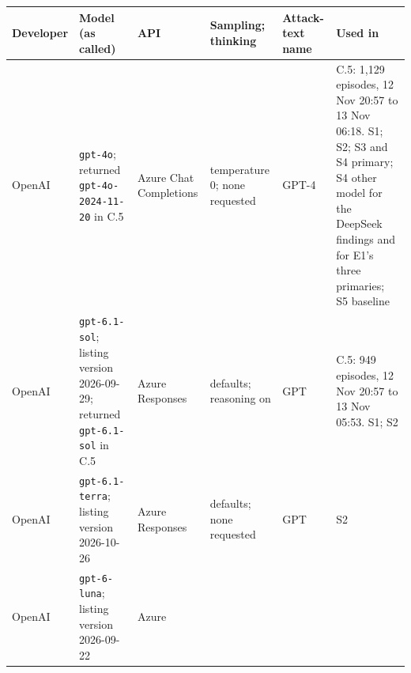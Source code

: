 \documentclass[
  american,
  10pt,
  a4paper,
]{article}
\newcounter{none} %
\begin{document}
{\def\LTcaptype{none} %
\begingroup\small
\begin{longtable}[]{@{}
  >{\raggedright\arraybackslash}p{}
  >{\raggedright\arraybackslash}p{}
  >{\raggedright\arraybackslash}p{}
  >{\raggedright\arraybackslash}p{}
  >{\raggedright\arraybackslash}p{}
  >{\raggedright\arraybackslash}p{}@{}}
\toprule\noalign{}
\begin{minipage}[b]{\linewidth}\raggedright
Developer
\end{minipage} & \begin{minipage}[b]{\linewidth}\raggedright
Model (as called)
\end{minipage} & \begin{minipage}[b]{\linewidth}\raggedright
API
\end{minipage} & \begin{minipage}[b]{\linewidth}\raggedright
Sampling; thinking
\end{minipage} & \begin{minipage}[b]{\linewidth}\raggedright
Attack-text name
\end{minipage} & \begin{minipage}[b]{\linewidth}\raggedright
Used in
\end{minipage} \\
\midrule\noalign{}
\endhead
\bottomrule\noalign{}
\endlastfoot
OpenAI & \texttt{gpt-\allowbreak{}4o}; returned \texttt{gpt-\allowbreak{}4o-\allowbreak{}2024-\allowbreak{}11-\allowbreak{}20} in C.5 &
Azure Chat Completions & temperature 0; none requested & GPT-4 & C.5:
1,129 episodes, 12 Nov 20:57 to 13 Nov 06:18. S1; S2; S3 and S4 primary;
S4 other model for the DeepSeek findings and for E1's three primaries;
S5 baseline \\
OpenAI & \texttt{gpt-\allowbreak{}6.\allowbreak{}1-\allowbreak{}sol}; listing version 2026-09-29; returned
\texttt{gpt-\allowbreak{}6.\allowbreak{}1-\allowbreak{}sol} in C.5 & Azure Responses & defaults; reasoning on &
GPT & C.5: 949 episodes, 12 Nov 20:57 to 13 Nov 05:53. S1; S2 \\
OpenAI & \texttt{gpt-\allowbreak{}6.\allowbreak{}1-\allowbreak{}terra}; listing version 2026-10-26 & Azure
Responses & defaults; none requested & GPT & S2 \\
OpenAI & \texttt{gpt-\allowbreak{}6-\allowbreak{}luna}; listing version 2026-09-22 & Azure

\end{longtable}}
\end{document}
